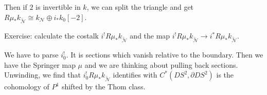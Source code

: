 \documentclass[12pt]{article}
\begin{document}
Then if $2$ is invertible in $k$, we can split the triangle and get $R\mu_* k_{\tilde{\mathcal{N}}} \cong k_{\mathcal N} \oplus i_* k_0[-2]$. 

Exercise: calculate the costalk $i^!R\mu_* k_{\tilde{\mathcal{N}}}$ and the map $i^! R\mu_* k_{\tilde{\mathcal{N}}} \to i^* R\mu_* k_{\tilde{\mathcal{N}}}$.

We have to parse $i_0^!$. It is sections which vanish relative to the boundary. Then we have the Springer map $\mu$ and we are thinking about pulling back sections. Unwinding, we find that $i_0^! R\mu_* k_{\tilde{\mathcal{N}}}$ identifies with $C^*(DS^2, \partial DS^2)$ is the cohomology of $P^1$ shifted by the Thom class.
\end{document}

